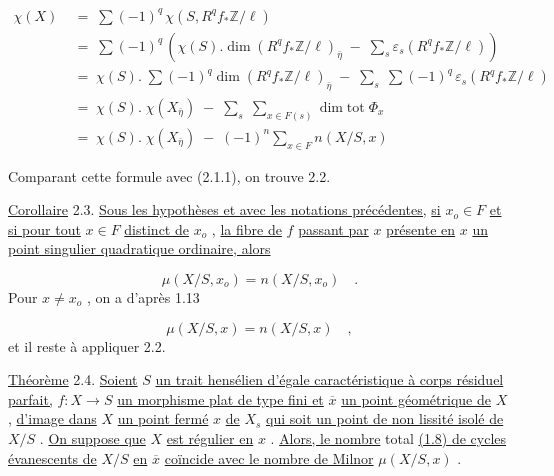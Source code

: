 \begin{equation*}
\begin{aligned} \chi(X) \; &= \; \sum (-1)^q \, \chi(S,R^q f_* \mathbb{Z}/\ell) \\[1ex] &= \; \sum (-1)^q \, (\chi(S).\dim(R^q f_* \mathbb{Z}/\ell)_{\bar{\eta}} \; - \; \sum_s \varepsilon_s(R^q f_* \mathbb{Z}/\ell)) \\[1ex] &= \; \chi(S). \; \sum (-1)^q \dim(R^q f_* \mathbb{Z}/\ell)_{\bar{\eta}} \; - \; \sum_s \; \sum (-1)^q \, \varepsilon_s(R^q f_* \mathbb{Z}/\ell) \\[1ex] &= \; \chi(S). \; \chi(X_{\bar{\eta}}) \; - \; \sum_s \; \sum_{x \in F(s)} \dim \mathrm{tot} \; \Phi_x \\[1ex] &= \; \chi(S). \; \chi(X_{\bar{\eta}}) \; - \; (-1)^n \sum_{x \in F} n(X/S,x) \end{aligned}
\end{equation*}


Comparant cette formule avec (2.1.1), on trouve 2.2.

\underline{Corollaire} 2.3. \underline{Sous les hypothèses et avec les notations précédentes,} \underline{si} $x_o \in F$ \underline{et si pour tout} $x \in F$ \underline{distinct de} $x_o$ , \underline{la fibre de} $f$ \underline{passant par} $x$ \underline{présente en} $x$ \underline{un point singulier quadratique ordinaire, alors}

\begin{equation*}
\mu(X/S,x_o) = n(X/S,x_o) \quad .
\end{equation*}
Pour $x \neq x_o$ , on a d'après 1.13

\begin{equation*}
\mu(X/S,x) = n(X/S,x) \quad ,
\end{equation*}
et il reste à appliquer 2.2.

\underline{Théorème} 2.4. \underline{Soient} $S$ \underline{un trait hensélien d'égale caractéristique à corps résiduel parfait,} $f : X \to S$ \underline{un morphisme plat de type fini et} $\overline{x}$ \underline{un point géométrique de} $X$ , \underline{d'image dans} $X$ \underline{un point fermé} $x$ \underline{de} $X_s$ \underline{qui soit un point de non lissité isolé de} $X/S$ . \underline{On suppose que} $X$ \underline{est régulier en} $x$ . \underline{Alors, le nombre} total \underline{(1.8) de cycles évanescents de} $X/S$ \underline{en} $\overline{x}$ \underline{coïncide avec le nombre de Milnor} $\mu(X/S,x)$ .

